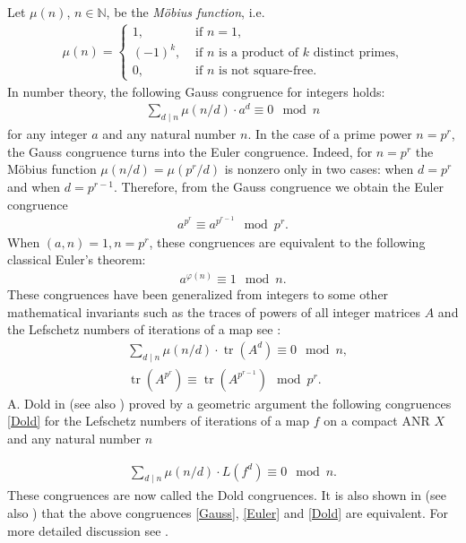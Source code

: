 \documentclass[oneside]{amsart}
\def\N{\mathbb{N}}
\def\tr{\operatorname{tr}}
\begin{document}
Let $\mu(n)$, $n\in\N$, be the {\em M\"obius function}, i.e.
\begin{align*}
  \mu(n) = \left\{
  \begin{array}{ll}
    1, & \mbox{ if } n=1,  \\
    (-1)^k, & \mbox{ if }  n  \mbox{ is a product of } k \mbox{ distinct primes,}\\
    0, & \mbox{ if }  n  \mbox{ is not square-free.}
  \end{array}
  \right.
\end{align*}
In number theory, the following Gauss congruence for integers holds:
\begin{align*}
  \sum_{d\mid n}\mu(n/d)\cdot a^{d}\equiv 0\mod n
\end{align*}
for any integer $a$ and any natural number $n$. In the case of a prime power $n=p^r$, the Gauss congruence turns into the Euler congruence. Indeed, for $n=p^r$ the M\"obius function $\mu(n/d)=\mu(p^r/d)$ is nonzero only in two cases: when $d=p^r$ and when $d=p^{r-1}$. Therefore, from the Gauss congruence we obtain the Euler congruence
\begin{align*}
  a^{p^r}\equiv a^{p^{r-1}}\mod p^r.
\end{align*}
When $(a,n)=1, n=p^r$, these congruences are equivalent to the following classical Euler's theorem:
\begin{align*}
  a^{\varphi(n)}\equiv 1\mod n.
\end{align*}
These congruences have been generalized from integers to some other mathematical invariants such as the traces of powers of all integer matrices $A$ and the Lefschetz numbers of iterations  of a map {see \cite{mp99,Z}}:
\begin{align} \label{Gauss}
&\sum_{d\mid n}\mu(n/d)\cdot \tr(A^{d})\equiv 0\mod n,\\
\label{Euler}
&\tr(A^{p^r})\equiv\tr(A^{p^{r-1}})\mod p^r.
\end{align}
A. Dold in \cite{Dold83} (see also \cite[Theorem 3.1.4]{JezMar}) proved by a geometric argument
the following congruences \eqref{Dold} for the Lefschetz numbers of iterations of a map $f$
on a compact ANR $X$ and any natural number $n$

\begin{align}
\label{Dold}
\sum_{d\mid n}\mu(n/d)\cdot L(f^{d})\equiv 0\mod n .\tag{DL}
\end{align}
These congruences are now called the Dold congruences.
It is also shown in \cite{mp99} (see also \cite[Theorem~9]{Z}) that the above congruences \eqref{Gauss},
\eqref{Euler} and \eqref{Dold} are equivalent. For more detailed discussion see \cite{ByszGraffWard}.
\end{document}
